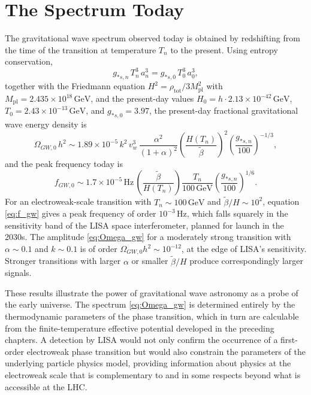 \section{The Spectrum Today}

The gravitational wave spectrum observed today is obtained by
redshifting from the time of the transition at temperature $T_n$ to
the present. Using entropy conservation,
\begin{equation}
	g_{*s,n}\,T_n^3\,a_n^3 = g_{*s,0}\,T_0^3\,a_0^3,
\end{equation}
together with the Friedmann equation
$H^2 = \rho_{\text{tot}}/3M_{\text{pl}}^2$ with
$M_{\text{pl}} = 2.435\times 10^{18}\,\text{GeV}$, and the
present-day values $H_0 = h\cdot 2.13\times 10^{-42}\,\text{GeV}$,
$T_0 = 2.43\times 10^{-13}\,\text{GeV}$, and $g_{*s,0} = 3.97$,
the present-day fractional gravitational wave energy density is
\begin{equation}
	\Omega_{GW,0}\,h^2 \sim 1.89\times 10^{-5}\,k^2\,v_w^3\,
	\frac{\alpha^2}{(1+\alpha)^2}
	\left(\frac{H(T_n)}{\tilde\beta}\right)^2
	\left(\frac{g_{*s,n}}{100}\right)^{-1/3},
	\label{eq:Omega_gw}
\end{equation}
and the peak frequency today is
\begin{equation}
	f_{GW,0} \sim 1.7\times 10^{-5}\,\text{Hz}\,
	\left(\frac{\tilde\beta}{H(T_n)}\right)
	\frac{T_n}{100\,\text{GeV}}
	\left(\frac{g_{*s,n}}{100}\right)^{1/6}.
	\label{eq:f_gw}
\end{equation}
For an electroweak-scale transition with $T_n \sim 100\,\text{GeV}$
and $\tilde\beta/H \sim 10^2$, equation \eqref{eq:f_gw} gives a peak
frequency of order $10^{-3}\,\text{Hz}$, which falls squarely in the
sensitivity band of the LISA space interferometer, planned for launch
in the 2030s. The amplitude \eqref{eq:Omega_gw} for a moderately
strong transition with $\alpha \sim 0.1$ and $k \sim 0.1$ is of order
$\Omega_{GW,0}h^2 \sim 10^{-12}$, at the edge of LISA's sensitivity.
Stronger transitions with larger $\alpha$ or smaller $\tilde\beta/H$
produce correspondingly larger signals.

These results illustrate the power of gravitational wave astronomy as
a probe of the early universe. The spectrum \eqref{eq:Omega_gw} is
determined entirely by the thermodynamic parameters of the phase
transition, which in turn are calculable from the finite-temperature
effective potential developed in the preceding chapters. A detection
by LISA would not only confirm the occurrence of a first-order
electroweak phase transition but would also constrain the parameters
of the underlying particle physics model, providing information about
physics at the electroweak scale that is complementary to and in some
respects beyond what is accessible at the LHC.
